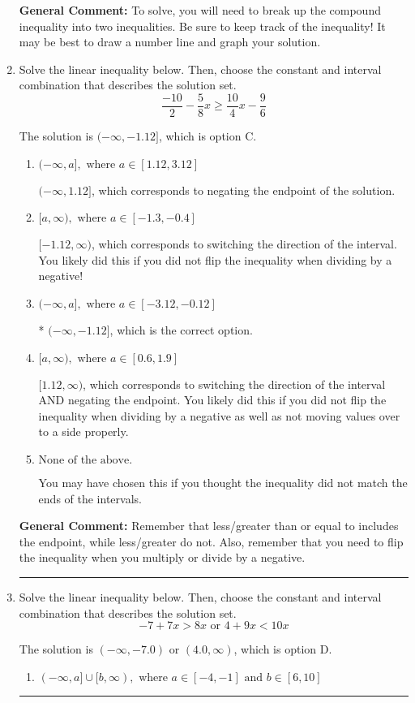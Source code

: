 \documentclass{extbook}[14pt]
\newcommand{\litem}[1]{\item #1

\rule{\textwidth}{0.4pt}}
\begin{document}
\begin{enumerate}
{\textbf{General Comment:} To solve, you will need to break up the compound inequality into two inequalities. Be sure to keep track of the inequality! It may be best to draw a number line and graph your solution.
}
\litem{
Solve the linear inequality below. Then, choose the constant and interval combination that describes the solution set.
\[ \frac{-10}{2} - \frac{5}{8} x \geq \frac{10}{4} x - \frac{9}{6} \]

The solution is \( (-\infty, -1.12] \), which is option C.\begin{enumerate}[label=\Alph*.]
\item \( (-\infty, a], \text{ where } a \in [1.12, 3.12] \)

 $(-\infty, 1.12]$, which corresponds to negating the endpoint of the solution.
\item \( [a, \infty), \text{ where } a \in [-1.3, -0.4] \)

 $[-1.12, \infty)$, which corresponds to switching the direction of the interval. You likely did this if you did not flip the inequality when dividing by a negative!
\item \( (-\infty, a], \text{ where } a \in [-3.12, -0.12] \)

* $(-\infty, -1.12]$, which is the correct option.
\item \( [a, \infty), \text{ where } a \in [0.6, 1.9] \)

 $[1.12, \infty)$, which corresponds to switching the direction of the interval AND negating the endpoint. You likely did this if you did not flip the inequality when dividing by a negative as well as not moving values over to a side properly.
\item \( \text{None of the above}. \)

You may have chosen this if you thought the inequality did not match the ends of the intervals.
\end{enumerate}

\textbf{General Comment:} Remember that less/greater than or equal to includes the endpoint, while less/greater do not. Also, remember that you need to flip the inequality when you multiply or divide by a negative.
}
\litem{
Solve the linear inequality below. Then, choose the constant and interval combination that describes the solution set.
\[ -7 + 7 x > 8 x \text{ or } 4 + 9 x < 10 x \]

The solution is \( (-\infty, -7.0) \text{ or } (4.0, \infty) \), which is option D.\begin{enumerate}[label=\Alph*.]
\item \( (-\infty, a] \cup [b, \infty), \text{ where } a \in [-4, -1] \text{ and } b \in [6, 10] \)


\end{enumerate}}
\end{enumerate}
\end{document}
